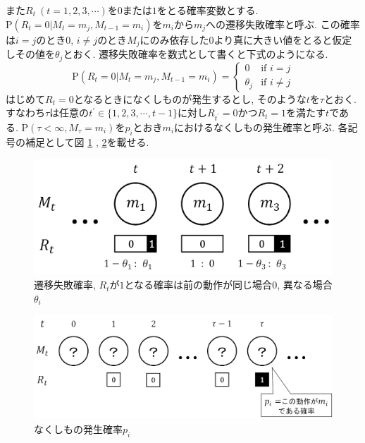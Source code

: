 また$ R_t\ (t=1,2,3,\cdots) $を$ 0 $または$ 1 $をとる確率変数とする. 
$ \mathrm{P}(R_t = 0 | M_t = m_j , M_{t - 1} = m_i) $を$ m_i $から$ m_j $への遷移失敗確率と呼ぶ. 
この確率は$ i = j $のとき$ 0 $, $ i \ne j $のとき$ M_j $にのみ依存した$ 0 $より真に大きい値をとると仮定しその値を$ \theta_j $とおく. %
遷移失敗確率を数式として書くと下式のようになる. 
\begin{equation}
    \mathrm{P}(R_t = 0 | M_t = m_j , M_{t - 1} = m_i) =
    \begin{cases}
        0        & \text{if $i = j$}\\
        \theta_j & \text{if $i \ne j$}
    \end{cases}
\end{equation}
はじめて$ R_t = 0 $となるときになくしものが発生するとし, そのような$ t $を$ \tau $とおく. 
すなわち$ \tau $は任意の$ t^{\prime} \in \{1,2,3,\cdots,t-1\} $に対し$ R_{t^{\prime}} = 0 $かつ$ R_t = 1 $を満たす$ t $である. 
$ \mathrm{P}(\tau < \infty , M_{\tau} = m_i) $を$ p_i $とおき$ m_i $におけるなくしもの発生確率と呼ぶ. 
各記号の補足として図 \ref{fig:r} , \ref{fig:p}を載せる. 

\begin{figure}[H]
    \begin{center}
    \includegraphics[width=0.8\linewidth]{figs/miss_prob.png}
    \caption{遷移失敗確率, $R_t$が$1$となる確率は前の動作が同じ場合$0$, 異なる場合$\theta_i$}
    \label{fig:r}
    \end{center}
\end{figure}

\begin{figure}[H]
    \begin{center}
    \includegraphics[width=1.0\linewidth]{figs/lost_prob.png}
    \caption{なくしもの発生確率$p_i$}
    \label{fig:p}
    \end{center}
\end{figure}

